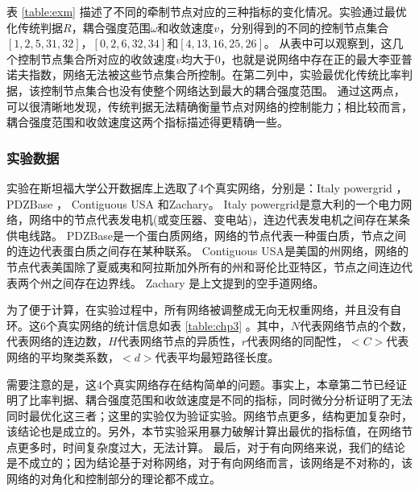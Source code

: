 表 \ref{table:exm} 描述了不同的牵制节点对应的三种指标的变化情况。实验通过最优化传统判据$ R $，耦合强度范围$ \omega $和收敛速度$ v $，分别得到的不同的控制节点集合$ [1,2,5,31,32] $，$ [0,2,6,32,34] $和$ [4,13,16,25,26] $。
从表中可以观察到，这几个控制节点集合所对应的收敛速度$ v $均大于$ 0 $，也就是说网络中存在正的最大李亚普诺夫指数，网络无法被这些节点集合所控制。在第二列中，实验最优化传统比率判据，该控制节点集合也没有使整个网络达到最大的耦合强度范围。
通过这两点，可以很清晰地发现，传统判据无法精确衡量节点对网络的控制能力；相比较而言，耦合强度范围和收敛速度这两个指标描述得更精确一些。

\subsubsection{实验数据}
实验在斯坦福大学公开数据库上选取了4个真实网络，分别是：Italy powergrid \cite{Motter2013}， PDZBase \cite{Beuming2005}， Contiguous USA \cite{Knuth2008}和Zachary。
Italy powergrid是意大利的一个电力网络，网络中的节点代表发电机(或变压器、变电站)，连边代表发电机之间存在某条供电线路。
PDZBase是一个蛋白质网络，网络的节点代表一种蛋白质，节点之间的连边代表蛋白质之间存在某种联系。
Contiguous USA是美国的州网络，网络的节点代表美国除了夏威夷和阿拉斯加外所有的州和哥伦比亚特区，节点之间连边代表两个州之间存在边界线。
Zachary 是上文提到的空手道网络。

为了便于计算，在实验过程中，所有网络被调整成无向无权重网络，并且没有自环。这6个真实网络的统计信息如表 \ref{table:chp3} 。其中，$ N $代表网络节点的个数，代表网络的连边数，$ H $代表网络节点的异质性，$ r $代表网络的同配性，$ <C> $代表网络的平均聚类系数，$ <d> $代表平均最短路径长度。

需要注意的是，这4个真实网络存在结构简单的问题。事实上，本章第二节已经证明了比率判据、耦合强度范围和收敛速度是不同的指标，同时微分分析证明了无法同时最优化这三者；这里的实验仅为验证实验。网络节点更多，结构更加复杂时，该结论也是成立的。另外，本节实验采用暴力破解计算出最优的指标值，在网络节点更多时，时间复杂度过大，无法计算。
最后，对于有向网络来说，我们的结论是不成立的；因为结论基于对称网络，对于有向网络而言，该网络是不对称的，该网络的对角化和控制部分的理论都不成立。


\begin{table}[h]
\end{table}

